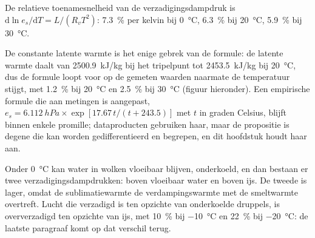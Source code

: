 \begin{corollary}\label{cor:b2:atmospheric-thermodynamics:seven}
De relatieve toenamesnelheid van de verzadigingsdampdruk is
$\mathrm{d}\ln e_s/\mathrm{d}T = L/(R_v T^2)$: \qty{7.3}{\percent} per kelvin bij
\qty{0}{\celsius}, \qty{6.3}{\percent} bij \qty{20}{\celsius}, \qty{5.9}{\percent} bij
\qty{30}{\celsius}.
\end{corollary}

De constante latente warmte is het enige gebrek van de formule: de latente warmte daalt van
\qty{2500.9}{kJ/kg} bij het tripelpunt tot \qty{2453.5}{kJ/kg} bij \qty{20}{\celsius}, dus de
formule loopt voor op de gemeten waarden naarmate de temperatuur stijgt, met \qty{1.2}{\percent} bij
\qty{20}{\celsius} en \qty{2.5}{\percent} bij \qty{30}{\celsius} (figuur hieronder). Een empirische
formule die aan metingen is aangepast, $e_s = \qty{6.112}{hPa} \times \exp[17.67\,t/(t + 243.5)]$ met
$t$ in graden Celsius, blijft binnen enkele promille; dataproducten gebruiken haar, maar de
propositie is degene die kan worden gedifferentieerd en begrepen, en dit hoofdstuk houdt haar aan.

Onder \qty{0}{\celsius} kan water in wolken vloeibaar blijven, onderkoeld, en dan bestaan er twee
verzadigingsdampdrukken: boven vloeibaar water en boven ijs. De tweede is lager, omdat de
sublimatiewarmte de verdampingswarmte met de smeltwarmte overtreft. Lucht die verzadigd is
ten opzichte van onderkoelde druppels, is oververzadigd ten opzichte van ijs, met \qty{10}{\percent} bij
\qty{-10}{\celsius} en \qty{22}{\percent} bij \qty{-20}{\celsius}: de laatste paragraaf komt op
dat verschil terug.

